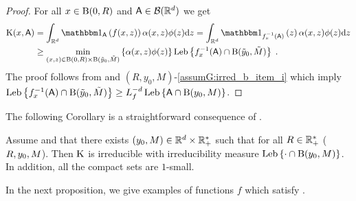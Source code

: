 \begin{proof}%
For all $x  \in \operatorname{B}(0,R)$ and $\mathsf{A} \in \mathcal{B}(\mathbb{R}^d)$ we get
\begin{align}
\nonumber
\Pkerb(x,\eventA)  &= \int_{\rset^d}\indi{\eventA}{\hfunb(x,z)} \alphagen(x,z) \phib(z) \rmd z  = \int_{\rset^d}\indi{\hfunb_x^{-1}(\eventA)}{z} \alphagen(x,z) \phib(z) \rmd z \\
&\geq  \min_{(x,z) \in \ball{0}{R} \times \ball{\tilde{y}_0}{\tilde{M}}} \defEns{\alphagen(x,z)\phib(z)} \Leb\defEns{\hfunb_x^{-1}(\eventA) \cap\ball{\tilde{y}_0}{\tilde{M}}} \eqsp.
\label{eq:coro_leb_irred_1}
\end{align}
The proof follows from  and $(R,y_0,M)$-\ref{assumG:irred_b_item_i} which imply
$ \operatorname{Leb}\left\lbrace f_x^{-1}(\mathsf{A} )\cap \operatorname{B}(\tilde{y}_0,\tilde{M}) \right\rbrace \geq  L_{f}^{-d}  \operatorname{Leb}\left\lbrace \mathsf{A}  \cap \operatorname{B}(y_0,M) \right\rbrace$.
\end{proof}
The following Corollary is a straightforward consequence of .
\begin{corollary}
\label{coro:irred}
Assume  and  that there exists $(y_0,M) \in \mathbb{R}^d \times \mathbb{R}_+^*$ such that  for all $R \in \mathbb{R}_+^*$ ($R,y_0,M$). Then $\mathrm{K}$ is irreducible with irreducibility measure $\operatorname{Leb}\left\lbrace \cdot \cap \operatorname{B}(y_0,M) \right\rbrace $. In addition, all the compact sets are $1$-small.
\end{corollary}
In the next proposition, we give examples of functions $f$ which satisfy .
